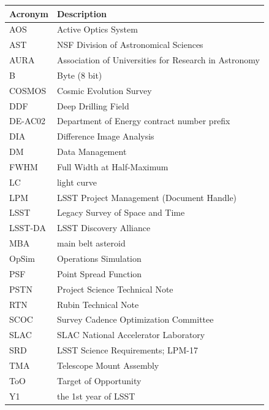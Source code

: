 \addtocounter{table}{-1}
\begin{longtable}{p{}p{}}\hline
\textbf{Acronym} & \textbf{Description}  \\\hline

AOS & Active Optics System \\\hline
AST & NSF Division of Astronomical Sciences \\\hline
AURA & Association of Universities for Research in Astronomy \\\hline
B & Byte (8 bit) \\\hline
COSMOS & Cosmic Evolution Survey \\\hline
DDF & Deep Drilling Field \\\hline
DE-AC02 & Department of Energy contract number prefix \\\hline
DIA & Difference Image Analysis \\\hline
DM & Data Management \\\hline
FWHM & Full Width at Half-Maximum \\\hline
LC & light curve \\\hline
LPM & LSST Project Management (Document Handle) \\\hline
LSST & Legacy Survey of Space and Time \\\hline
LSST-DA & LSST Discovery Alliance \\\hline
MBA & main belt asteroid \\\hline
OpSim & Operations Simulation \\\hline
PSF & Point Spread Function \\\hline
PSTN & Project Science Technical Note \\\hline
RTN & Rubin Technical Note \\\hline
SCOC & Survey Cadence Optimization Committee \\\hline
SLAC & SLAC National Accelerator Laboratory \\\hline
SRD & LSST Science Requirements; LPM-17 \\\hline
TMA & Telescope Mount Assembly \\\hline
ToO & Target of Opportunity \\\hline
Y1 & the 1st year of LSST \\\hline
\end{longtable}
